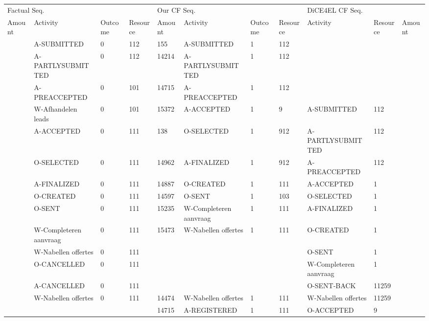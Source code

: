 \begin{tabular}{lllllllllll}
\toprule
\multicolumn{4}{l}{Factual Seq.} & \multicolumn{4}{l}{Our CF Seq.} & \multicolumn{3}{l}{DiCE4EL CF Seq.} \\
Amount & Activity & Outcome & Resource & Amount & Activity & Outcome & Resource & Activity & Resource & Amount \\
\midrule
 & A-SUBMITTED & 0 & 112 & 155 & A-SUBMITTED & 1 & 112 &  &  &  \\
 & A-PARTLYSUBMITTED & 0 & 112 & 14214 & A-PARTLYSUBMITTED & 1 & 112 &  &  &  \\
 & A-PREACCEPTED & 0 & 101 & 14715 & A-PREACCEPTED & 1 & 112 &  &  &  \\
 & W-Afhandelen leads & 0 & 101 & 15372 & A-ACCEPTED & 1 & 9 & A-SUBMITTED & 112 &  \\
 & A-ACCEPTED & 0 & 111 & 138 & O-SELECTED & 1 & 912 & A-PARTLYSUBMITTED & 112 &  \\
 & O-SELECTED & 0 & 111 & 14962 & A-FINALIZED & 1 & 912 & A-PREACCEPTED & 112 &  \\
 & A-FINALIZED & 0 & 111 & 14887 & O-CREATED & 1 & 111 & A-ACCEPTED & 1 &  \\
 & O-CREATED & 0 & 111 & 14597 & O-SENT & 1 & 103 & O-SELECTED & 1 &  \\
 & O-SENT & 0 & 111 & 15235 & W-Completeren aanvraag & 1 & 111 & A-FINALIZED & 1 &  \\
 & W-Completeren aanvraag & 0 & 111 & 15473 & W-Nabellen offertes & 1 & 111 & O-CREATED & 1 &  \\
 & W-Nabellen offertes & 0 & 111 &  &  &  &  & O-SENT & 1 &  \\
 & O-CANCELLED & 0 & 111 &  &  &  &  & W-Completeren aanvraag & 1 &  \\
 & A-CANCELLED & 0 & 111 &  &  &  &  & O-SENT-BACK & 11259 &  \\
 & W-Nabellen offertes & 0 & 111 & 14474 & W-Nabellen offertes & 1 & 111 & W-Nabellen offertes & 11259 &  \\
 &  &  &  & 14715 & A-REGISTERED & 1 & 111 & O-ACCEPTED & 9 &  \\
\bottomrule
\end{tabular}
